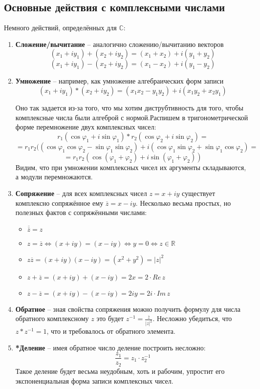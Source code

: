\subsection{Основные действия с комплексными числами}
Немного действий, определённых для $\mathbb{C}$:
\begin{enumerate}
    \item \textbf{Сложение/вычитание} -- аналогично сложению/вычитанию векторов
          $$(x_1 + iy_1) + (x_2 + iy_2) = (x_1 + x_2) + i(y_1 + y_2)$$
          $$(x_1 + iy_1) - (x_2 + iy_2) = (x_1 - x_2) + i(y_1 - y_2)$$
    \item \textbf{Умножение} -- например, как умножение алгебраических форм записи
          $$(x_1 + iy_1) * (x_2 + iy_2) = (x_1x_2 - y_1y_2) + i(x_1y_2 + x_2y_1)$$

          Оно так задается из-за того, что мы хотим диструбтивность для того, чтобы комплексные числа были алгеброй с нормой.Распишем в тригонометрической форме перемножение двух комплексных чисел:
          $$r_1(\cos{\varphi_1}+i\sin{\varphi_1}) * r_2(\cos{\varphi_2}+i\sin{\varphi_2}) =$$
          $$=r_1r_2((\cos{\varphi_1}\cos{\varphi_2} - \sin{\varphi_1}\sin{\varphi_2}) + i(\cos{\varphi_1}\sin{\varphi_2} + \sin{\varphi_1}\cos{\varphi_2}) =$$
          $$=r_1r_2(\cos{(\varphi_1 + \varphi_2)} + i\sin{(\varphi_1 + \varphi_2)})$$
          Видим, что при умножении комплексных чисел их аргументы складываются, а модули перемножаются.
    \item \textbf{Сопряжение} -- для всех комплексных чисел $z=x+iy$ существует комплексно сопряжённое ему $\overline{z}=x-iy$. Несколько весьма простых, но полезных фактов с сопряжёнными числами:
          \begin{itemize}
              \item $\overline{\overline{z}} = z$
              \item $z=\overline{z} \Leftrightarrow (x+iy)=(x-iy) \Leftrightarrow y=0 \Leftrightarrow z\in \mathbb{R}$
              \item $z\overline{z}=(x + iy)(x - iy)=(x^2 + y^2)=|z|^2$
              \item $z+\overline{z}=(x + iy) + (x - iy)= 2x = 2 \cdot Re\,z$
              \item $z-\overline{z}=(x + iy) - (x - iy)= 2iy = 2i \cdot Im\,z$
          \end{itemize}
    \item \textbf{Обратное} -- зная свойства сопряжения можно получить формулу для числа обратного комплексному $z$ это будет $z^{-1}=\frac{\overline{z}}{|z|^2}$. Несложно убедиться, что $z*z^{-1}=1$, что и требовалось от обратного элемента.
    \item \textbf{*Деление} -- имея обратное число деление построить несложно:
          $$\frac{z_1}{z_2} = z_1 \cdot z_2^{-1}$$
          Такое деление будет весьма неудобным, хоть и рабочим, упростит его экспоненциальная форма записи комплексных чисел.
\end{enumerate}

